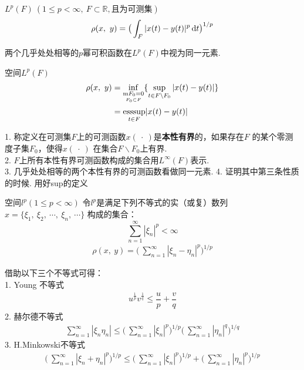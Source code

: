 \begin{newex}
	$L^p(F) \ (1 \leqslant p < \infty , \ F \subset \mathbb R , \mbox{且为可测集})$\
	\begin{align}
		\rho (x , \ y)= \big( \int_{F} |x(t)-y(t)|^p \operatorname{d\!} t \big)^{1/p}
		\label{eq:rho4}
	\end{align}
\end{newex}
\begin{note}
	两个几乎处处相等的$p$幂可积函数在$L^p(F)$中视为同一元素.
\end{note}

\begin{newex}
	空间$L^p (F)$
	\begin{align}
		\rho (x, \ y) & = \inf _{\underset{  F_0 \subset F}{  \mathrm{m} F_0=0}}
		\{ \sup\limits_{t \in F \backslash F_0}  | x(t)-y(t)|  \} \notag         \\
		              & = \underset{t \in F }{\mathrm{esssup}} |x(t) - y(t)|
	\end{align}
\end{newex}
\begin{note}
	1. 称定义在可测集$F$上的可测函数$x(\ \cdot \ )$是\textbf{本性有界}的，如果存在$F$
	的某个零测度子集$F_0$，使得$x( \ \cdot \ )$ 在集合$F\backslash F_0$上有界.\\
	2. $F$上所有本性有界可测函数构成的集合用$L^\infty (F)$表示.\\
	3. 几乎处处相等的两个本性有界的可测函数看做同一元素.
	4. 证明其中第三条性质的时候. 用好sup的定义
\end{note}

\begin{newex}
	空间$l^p (1 \leqslant p < \infty)$
	令$l^p$是满足下列不等式的实（或复）数列$x=\{ \xi_1,\ \xi_2, \ \cdots, \ \xi_n,\ \cdots  \}$
	构成的集合：$$\sum \limits_{n=1}^\infty |\xi_n|^p<\infty$$
	\begin{align}
		\rho(x, \ y)=\big(\ \sum \limits_{n=1}^\infty |\xi_n-\eta_n|^p  \big)^{1/p}
	\end{align}
\end{newex}
\begin{note}
	借助以下三个不等式可得：\\
	1. Young 不等式
	\begin{align}
		u^{\frac{1}{p}}v^{ \frac{1}{q}}\leqslant \dfrac{u}{p}+\dfrac{v}{q}
	\end{align}
	2. 赫尔德不等式
	\begin{align}
		\sum \limits_{n=1}^\infty |\xi_n \eta_n| \leqslant
		\big(\ \sum \limits_{n=1}^\infty |\xi_n|^p  \big)^{1/p}
		\big(\ \sum \limits_{n=1}^\infty |\eta_n|^q  \big)^{1/q}
	\end{align}
	3. H.Minkowski不等式
	\begin{align}
		\big(\ \sum \limits_{n=1}^\infty |\xi_n+\eta_n|^p  \big)^{1/p}\leqslant
		\big(\ \sum \limits_{n=1}^\infty |\xi_n|^p  \big)^{1/p}+
		\big(\ \sum \limits_{n=1}^\infty |\eta_n|^p  \big)^{1/p}
	\end{align}
\end{note}

